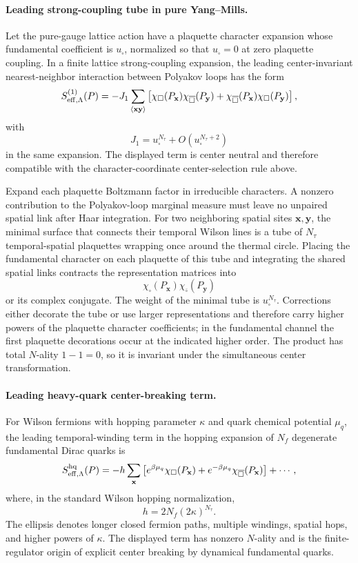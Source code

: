 \paragraph{Leading strong-coupling tube in pure Yang--Mills.}
Let the pure-gauge lattice action have a plaquette character expansion whose
fundamental coefficient is \(u_{\square}\), normalized so that
\(u_{\square}=0\) at zero plaquette coupling.  In a finite lattice
strong-coupling expansion, the leading center-invariant nearest-neighbor
interaction between Polyakov loops has the form
\[
  S_{\rm eff,\Lambda}^{(1)}(P)
  =
  -J_1
  \sum_{\langle\mathbf x\mathbf y\rangle}
  \left[
    \chi_{\square}(P_{\mathbf x})
    \chi_{\overline\square}(P_{\mathbf y})
    +
    \chi_{\overline\square}(P_{\mathbf x})
    \chi_{\square}(P_{\mathbf y})
  \right],
\]
with
\[
  J_1=u_{\square}^{N_\tau}+O(u_{\square}^{N_\tau+2})
\]
in the same expansion.  The displayed term is center neutral and therefore
compatible with the character-coordinate center-selection rule above.

Expand each plaquette Boltzmann factor in irreducible characters.  A
nonzero contribution to the Polyakov-loop marginal measure must leave no
unpaired spatial link after Haar integration.  For two neighboring spatial
sites \(\mathbf x,\mathbf y\), the minimal surface that connects their
temporal Wilson lines is a tube of \(N_\tau\) temporal-spatial plaquettes
wrapping once around the thermal circle.  Placing the fundamental character
on each plaquette of this tube and integrating the shared spatial links
contracts the representation matrices into
\[
  \chi_{\square}(P_{\mathbf x})
  \chi_{\overline\square}(P_{\mathbf y})
\]
or its complex conjugate.  The weight of the minimal tube is
\(u_{\square}^{N_\tau}\).  Corrections either decorate the tube or use
larger representations and therefore carry higher powers of the plaquette
character coefficients; in the fundamental channel the first plaquette
decorations occur at the indicated higher order.  The product has total
\(N\)-ality \(1-1=0\), so it is invariant under the simultaneous center
transformation.

\paragraph{Leading heavy-quark center-breaking term.}
For Wilson fermions with hopping parameter \(\kappa\) and quark chemical
potential \(\mu_q\), the leading temporal-winding term in the hopping
expansion of \(N_f\) degenerate fundamental Dirac quarks is
\[
  S_{\rm eff,\Lambda}^{\rm hq}(P)
  =
  -h
  \sum_{\mathbf x}
  \left[
    e^{\beta\mu_q}\chi_{\square}(P_{\mathbf x})
    +
    e^{-\beta\mu_q}\chi_{\overline\square}(P_{\mathbf x})
  \right]
  +\cdots,
\]
where, in the standard Wilson hopping normalization,
\[
  h=2N_f(2\kappa)^{N_\tau}.
\]
The ellipsis denotes longer closed fermion paths, multiple windings, spatial
hops, and higher powers of \(\kappa\).  The displayed term has nonzero
\(N\)-ality and is the finite-regulator origin of explicit center breaking
by dynamical fundamental quarks.

